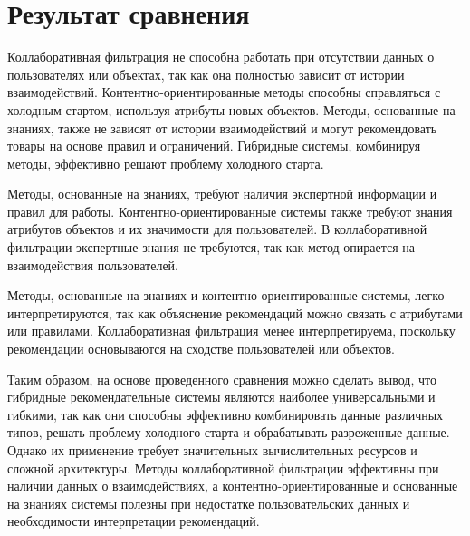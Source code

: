 \section{Результат сравнения}

Коллаборативная фильтрация не способна работать при отсутствии данных о
пользователях или объектах, так как она полностью зависит от истории взаимодействий.
Контентно-ориентированные методы способны справляться с холодным стартом, используя атрибуты
новых объектов. Методы, основанные на знаниях, также не зависят от истории взаимодействий и
могут рекомендовать товары на основе правил и ограничений. Гибридные системы, комбинируя методы,
эффективно решают проблему холодного старта.

Методы, основанные на знаниях, требуют наличия экспертной информации и правил для работы.
Контентно-ориентированные системы также требуют знания атрибутов объектов и их значимости для
пользователей. В коллаборативной фильтрации экспертные знания не требуются, так как метод
опирается на взаимодействия пользователей.

Методы, основанные на знаниях и контентно-ориентированные системы, легко интерпретируются,
так как объяснение рекомендаций можно связать с атрибутами или правилами.
Коллаборативная фильтрация менее интерпретируема, поскольку рекомендации основываются на
сходстве пользователей или объектов.

Таким образом, на основе проведенного сравнения можно сделать вывод, что
гибридные рекомендательные системы являются наиболее универсальными и гибкими,
так как они способны эффективно комбинировать данные различных типов,
решать проблему холодного старта и обрабатывать разреженные данные.
Однако их применение требует значительных вычислительных ресурсов и сложной архитектуры.
Методы коллаборативной фильтрации эффективны при наличии данных о
взаимодействиях, а контентно-ориентированные и основанные на знаниях системы полезны при
недостатке пользовательских данных и необходимости интерпретации рекомендаций.